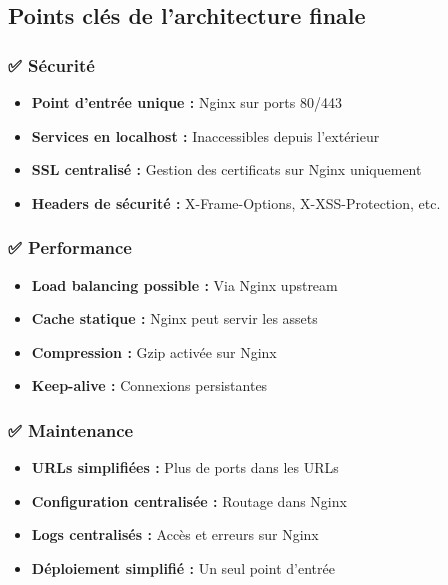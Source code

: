 \documentclass[12pt,a4paper]{article}
\begin{document}
\subsection{Points clés de l'architecture finale}

\subsubsection{✅ Sécurité}
\begin{itemize}[leftmargin=*]
    \item \textbf{Point d'entrée unique :} Nginx sur ports 80/443
    \item \textbf{Services en localhost :} Inaccessibles depuis l'extérieur
    \item \textbf{SSL centralisé :} Gestion des certificats sur Nginx uniquement
    \item \textbf{Headers de sécurité :} X-Frame-Options, X-XSS-Protection, etc.
\end{itemize}

\subsubsection{✅ Performance}
\begin{itemize}[leftmargin=*]
    \item \textbf{Load balancing possible :} Via Nginx upstream
    \item \textbf{Cache statique :} Nginx peut servir les assets
    \item \textbf{Compression :} Gzip activée sur Nginx
    \item \textbf{Keep-alive :} Connexions persistantes
\end{itemize}

\subsubsection{✅ Maintenance}
\begin{itemize}[leftmargin=*]
    \item \textbf{URLs simplifiées :} Plus de ports dans les URLs
    \item \textbf{Configuration centralisée :} Routage dans Nginx
    \item \textbf{Logs centralisés :} Accès et erreurs sur Nginx
    \item \textbf{Déploiement simplifié :} Un seul point d'entrée
\end{itemize}
\end{document}
